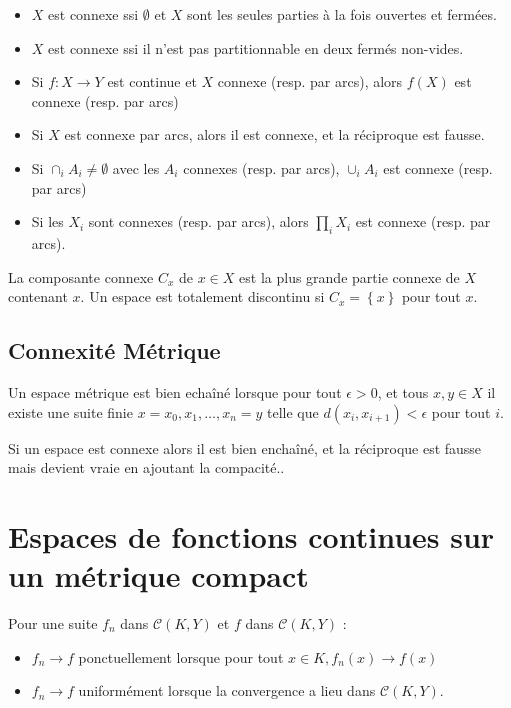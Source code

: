 \documentclass{cours}
\begin{document}
\begin{theorem}
    \begin{itemize}
        \item $X$ est connexe ssi $\emptyset$ et $X$ sont les seules parties à la fois ouvertes et fermées.
        \item $X$ est connexe ssi il n'est pas partitionnable en deux fermés non-vides.
        \item Si $f : X \to Y$ est continue et $X$ connexe (resp. par arcs), alors $f(X)$ est connexe (resp. par arcs)
        \item Si $X$ est connexe par arcs, alors il est connexe, et la réciproque est fausse.
        \item Si $\cap_{i} A_{i} \neq \emptyset$ avec les $A_{i}$ connexes (resp. par arcs), $\cup_{i} A_{i}$ est connexe (resp. par arcs)
        \item Si les $X_{i}$ sont connexes (resp. par arcs), alors $\prod_{i} X_{i}$ est connexe (resp. par arcs).
    \end{itemize}
\end{theorem}

\begin{definition}
    La composante connexe $C_{x}$ de $x \in X$ est la plus grande partie connexe de $X$ contenant $x$. Un espace est totalement discontinu si $C_{x} = \left\{x\right\}$ pour tout $x$. 
\end{definition}

\subsection{Connexité Métrique}
\begin{definition}
    Un espace métrique est bien echaîné lorsque pour tout $\epsilon >0$, et tous $x, y \in X$ il existe une suite finie $x = x_{0}, x_{1}, \ldots, x_{n} = y$ telle que $d(x_{i}, x_{i+1}) < \epsilon$ pour tout $i$.
\end{definition}

\begin{theorem}
    Si un espace est connexe alors il est bien enchaîné, et la réciproque est fausse mais devient vraie en ajoutant la compacité..
\end{theorem}

\section{Espaces de fonctions continues sur un métrique compact}
\begin{definition}
    Pour une suite $f_{n}$ dans $\mathcal{C}(K, Y)$ et $f$ dans $\mathcal{C}(K, Y)$ : \begin{itemize}
        \item $f_{n} \to f$ ponctuellement lorsque pour tout $x\in K, f_{n}(x) \to f(x)$
        \item $f_{n} \to f$ uniformément lorsque la convergence a lieu dans $\mathcal{C}(K, Y)$.
    \end{itemize}
\end{definition}
\end{document}
